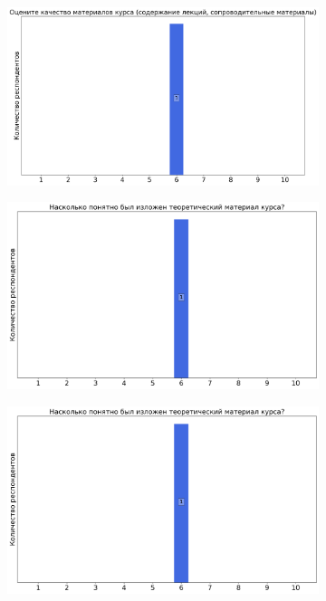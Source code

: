 \begin{figure}[H]
\begin{subfigure}[b]{0.45\textwidth}
                \centering
                \includegraphics[width=\textwidth]{images/3 course/ТФКП/lecturer-marks-Половинкин Е.С.-1.png}
            \end{subfigure}
            \begin{subfigure}[b]{0.45\textwidth}
                \centering
                \includegraphics[width=\textwidth]{images/3 course/ТФКП/lecturer-marks-Половинкин Е.С.-2.png}
            \end{subfigure}
            \begin{subfigure}[b]{0.45\textwidth}
                \centering
                \includegraphics[width=\textwidth]{images/3 course/ТФКП/lecturer-marks-Половинкин Е.С.-2.png}

\end{subfigure}
\end{figure}
